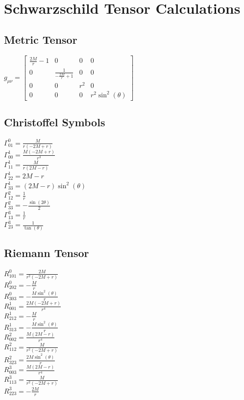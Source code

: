 \documentclass{article}
\begin{document}
\section*{Schwarzschild Tensor Calculations}
\subsection*{Metric Tensor}
$g_{\mu\nu} = \left[\begin{matrix}\frac{2 M}{r} - 1 & 0 & 0 & 0\\0 & \frac{1}{- \frac{2 M}{r} + 1} & 0 & 0\\0 & 0 & r^{2} & 0\\0 & 0 & 0 & r^{2} \sin^{2}{\left(\theta \right)}\end{matrix}\right]$

\subsection*{Christoffel Symbols}
$\Gamma^0_{01} = \frac{M}{r \left(- 2 M + r\right)}$\\
$\Gamma^1_{00} = \frac{M \left(- 2 M + r\right)}{r^{3}}$\\
$\Gamma^1_{11} = \frac{M}{r \left(2 M - r\right)}$\\
$\Gamma^1_{22} = 2 M - r$\\
$\Gamma^1_{33} = \left(2 M - r\right) \sin^{2}{\left(\theta \right)}$\\
$\Gamma^2_{12} = \frac{1}{r}$\\
$\Gamma^2_{33} = - \frac{\sin{\left(2 \theta \right)}}{2}$\\
$\Gamma^3_{13} = \frac{1}{r}$\\
$\Gamma^3_{23} = \frac{1}{\tan{\left(\theta \right)}}$\\
\subsection*{Riemann Tensor}
$R^0_{101} = \frac{2 M}{r^{2} \left(- 2 M + r\right)}$\\
$R^0_{202} = - \frac{M}{r}$\\
$R^0_{303} = - \frac{M \sin^{2}{\left(\theta \right)}}{r}$\\
$R^1_{001} = \frac{2 M \left(- 2 M + r\right)}{r^{4}}$\\
$R^1_{212} = - \frac{M}{r}$\\
$R^1_{313} = - \frac{M \sin^{2}{\left(\theta \right)}}{r}$\\
$R^2_{002} = \frac{M \left(2 M - r\right)}{r^{4}}$\\
$R^2_{112} = \frac{M}{r^{2} \left(- 2 M + r\right)}$\\
$R^2_{323} = \frac{2 M \sin^{2}{\left(\theta \right)}}{r}$\\
$R^3_{003} = \frac{M \left(2 M - r\right)}{r^{4}}$\\
$R^3_{113} = \frac{M}{r^{2} \left(- 2 M + r\right)}$\\
$R^3_{223} = - \frac{2 M}{r}$\\
\end{document}
